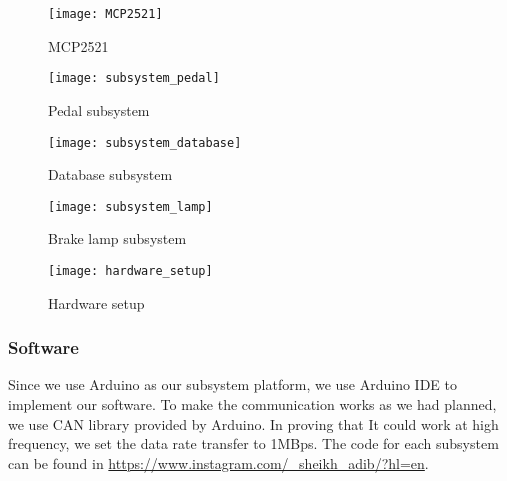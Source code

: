 \begin{figure}[h]
    \centering
    \texttt{[image: MCP2521]}
    \caption{MCP2521}
    \label{fig:MCP2521}
\end{figure}

\begin{figure}[h]
    \centering
    \texttt{[image: subsystem\_pedal]}
    \caption{Pedal subsystem}
    \label{fig:subsystem_pedal}
\end{figure}
\begin{figure}[h]
    \centering
    \texttt{[image: subsystem\_database]}
    \caption{Database subsystem}
    \label{fig:subsystem_database}
\end{figure}
\begin{figure}[h]
    \centering
    \texttt{[image: subsystem\_lamp]}
    \caption{Brake lamp subsystem}
    \label{fig:subsystem_lamp}
\end{figure}
\begin{figure}[h]
    \centering
    \texttt{[image: hardware\_setup]}
    \caption{Hardware setup}
    \label{fig:hardware_setup}
\end{figure}

\subsubsection{Software}

Since we use Arduino as our subsystem platform, we use Arduino IDE to implement our software. To make the communication works as we had planned, we use CAN library provided by Arduino. In proving that It could work at high frequency, we set the data rate transfer to 1MBps. The code for each subsystem can be found in \url{https://www.instagram.com/_sheikh_adib/?hl=en}.